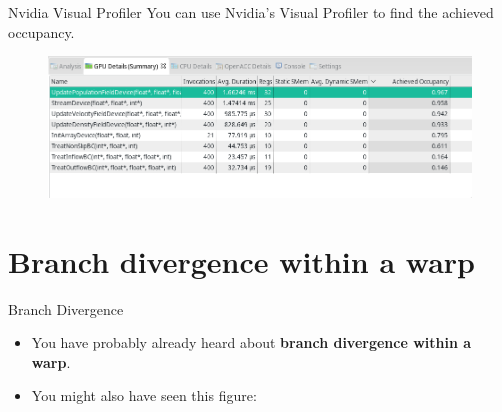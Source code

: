 \documentclass[9pt]{beamer}
\begin{document}

\begin{frame}{Nvidia Visual Profiler}
You can use Nvidia's Visual Profiler to find the achieved occupancy. 

\begin{figure}
\begin{center}
\includegraphics[scale=0.4]{images/nvvp_profile.png}
\end{center}
\end{figure}

\end{frame}

\section{Branch divergence within a warp}
\begin{frame}[t]{Branch Divergence }
\begin{itemize}
\item You have probably already heard about \textbf{branch divergence within a warp}.
\item You might also have seen this figure: \\
\end{itemize}
\end{frame}
\end{document}
